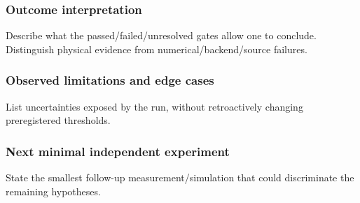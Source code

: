 \subsubsection*{Outcome interpretation}
Describe what the passed/failed/unresolved gates allow one to conclude. Distinguish physical evidence from numerical/backend/source failures.

\subsubsection*{Observed limitations and edge cases}
List uncertainties exposed by the run, without retroactively changing preregistered thresholds.

\subsubsection*{Next minimal independent experiment}
State the smallest follow-up measurement/simulation that could discriminate the remaining hypotheses.
